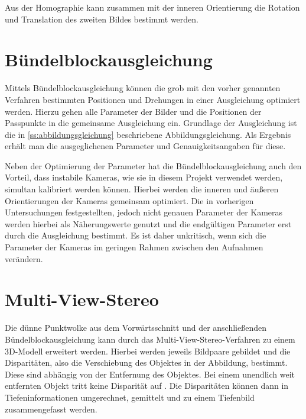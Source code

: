 \documentclass[./00PhotoBox.tex]{subfiles}
\begin{document}
Aus der Homographie kann zusammen mit der inneren Orientierung die Rotation und Translation des zweiten Bildes bestimmt werden.
\citep[vgl.][S. 74]{homography_decomposition}

\section{Bündelblockausgleichung}
\label{s:buendelblock}
Mittels Bündelblockausgleichung können die grob mit den vorher genannten Verfahren bestimmten Positionen und Drehungen in einer Ausgleichung optimiert werden. Hierzu gehen alle Parameter der Bilder und die Positionen der Passpunkte in die gemeinsame Ausgleichung ein. Grundlage der Ausgleichung ist die in \autoref{ss:abbildungsgleichung} beschriebene Abbildungsgleichung. Als Ergebnis erhält man die ausgeglichenen Parameter und Genauigkeitsangaben für diese. \citep[vgl.][S. 343ff]{luhmann}

Neben der Optimierung der Parameter hat die Bündelblockausgleichung auch den Vorteil, dass instabile Kameras, wie sie in diesem Projekt verwendet werden, simultan kalibriert werden können. Hierbei werden die inneren und äußeren Orientierungen der Kameras gemeinsam optimiert. Die in vorherigen Untersuchungen festgestellten, jedoch nicht genauen Parameter der Kameras werden hierbei als Näherungswerte genutzt und die endgültigen Parameter erst durch die Ausgleichung bestimmt. Es ist daher unkritisch, wenn sich die Parameter der Kameras im geringen Rahmen zwischen den Aufnahmen verändern. \citep[vgl.][S. 357f]{luhmann}


\section{Multi-View-Stereo}
Die dünne Punktwolke aus dem Vorwärtsschnitt und der anschließenden Bündel\-block\-ausgleichung kann durch das Multi-View-Stereo-Verfahren zu einem 3D-Modell erweitert werden. Hierbei werden jeweils Bildpaare gebildet und die Disparitäten, also die Verschiebung des Objektes in der Abbildung, bestimmt. Diese sind abhängig von der Entfernung des Objektes. Bei einem unendlich weit entfernten Objekt tritt keine Disparität auf \citep[vgl.][S. 313]{luhmann}. Die Disparitäten können dann in Tiefeninformationen umgerechnet, gemittelt und zu einem Tiefenbild zusammengefasst werden. \citep[vgl.][S. 505]{luhmann}
\end{document}
